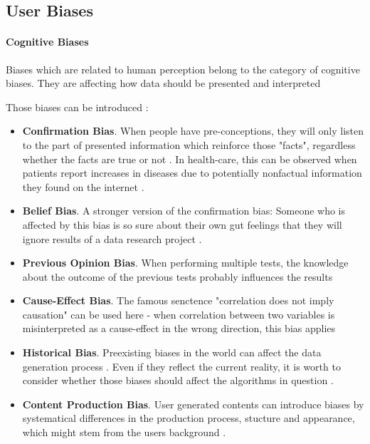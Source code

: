 \begin{refsection}
		
		\subsection{User Biases}
		
		\paragraph{Cognitive Biases}
		Biases which are related to human perception belong to the category of cognitive biases. They are affecting how data should be presented and interpreted \autocite{Mester_2017}
		
		Those biases can be introduced :
		\begin{itemize}
			\item \textbf{Confirmation Bias}. When people have pre-conceptions, they will only listen to the part of presented information which reinforce those "facts", regardless whether the facts are true or not \autocite{Mester_2017}. In health-care, this can be observed when patients report increases in diseases due to potentially nonfactual information they found on the internet \autocite{Chakraborty_2024, c15, c14}.
			\item \textbf{Belief Bias}. A stronger version of the confirmation bias: Someone who is affected by this bias is so sure about their own gut feelings that they will ignore results of a data research project \autocite{Mester_2017}.
			\item \textbf{Previous Opinion Bias}. When performing multiple tests, the knowledge about the outcome of the previous tests probably influences the results \autocite{Chakraborty_2024}
			\item \textbf{Cause-Effect Bias}. The famous senctence "correlation does not imply causation" can be used here - when correlation between two variables is misinterpreted as a cause-effect in the wrong direction, this bias applies  \autocite{Mester_2017}
			\item \textbf{Historical Bias}. Preexisting biases in the world can affect the data generation process \autocite{M144_Suresh_2021}. Even if they reflect the current reality, it is worth to consider whether those biases should affect the algorithms in question \autocite{Mehrabi_2021}.
			\item \textbf{Content Production Bias}. User generated contents can introduce biases by systematical differences in the production process, stucture and appearance, which might stem from the users background \autocite{M120_Olteanu_2019}.
		\end{itemize}
		

\end{refsection}
